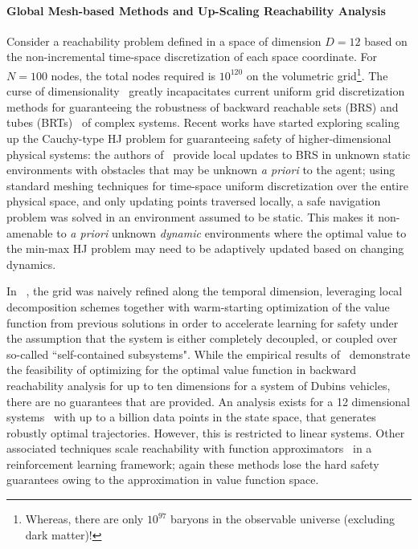 \paragraph{Global Mesh-based Methods and Up-Scaling Reachability Analysis}
Consider a reachability problem defined in a space of dimension $D=12$ based on the non-incremental time-space discretization of each space coordinate. For $N=100$ nodes, the total nodes required is $10^{120}$ on the volumetric grid\footnote{Whereas, there are only $10^{97}$ baryons in the observable universe (excluding dark matter)!}. The curse of dimensionality~\cite{Bellman1957} greatly incapacitates current uniform grid discretization methods for guaranteeing the robustness of backward reachable sets (BRS) and tubes (BRTs)~\cite{Mitchell2005} of complex systems. 
Recent works have started exploring scaling up the Cauchy-type HJ problem for guaranteeing safety of higher-dimensional physical systems: the authors of~\cite{Bajcsy} provide local updates to BRS in  unknown static environments with obstacles that may be unknown \textit{a priori} to the agent; using standard meshing techniques for time-space uniform discretization over the entire physical space, and only updating points traversed locally, a safe navigation problem was solved in an environment assumed to be static. 
This makes it non-amenable to \textit{a priori} unknown \textit{dynamic} environments where the optimal value to the min-max HJ problem may need to be adaptively updated based on changing dynamics. 

In ~\cite{SylviaScalability}, the grid was naively refined along the temporal dimension, leveraging local decomposition schemes together with warm-starting optimization of the value function from previous solutions in order to accelerate learning for safety under the assumption that the system is either completely decoupled, or coupled over so-called ``self-contained subsystems".  While the empirical results of~\cite{Bansal} demonstrate the feasibility of optimizing for the optimal value function in backward reachability analysis for up to ten dimensions for a system of Dubins vehicles, there are no guarantees that are provided. An analysis exists for a 12 dimensional systems~\cite{KaynamaScalable} with up to a billion data points in the state space, that generates robustly optimal trajectories. However, this is restricted to {linear systems}. Other associated techniques scale reachability with function approximators~\cite{FisacTAC, FisacICRA} in a reinforcement learning framework; again these methods lose the hard safety guarantees owing to the approximation in value function space.  

